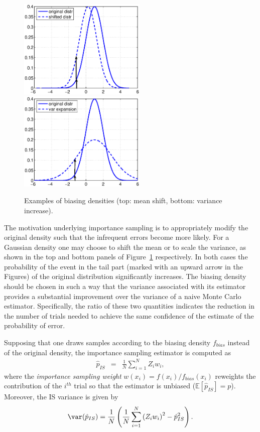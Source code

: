 \begin{figure}\centering
\includegraphics[width=2.4in,keepaspectratio]{itwfig3a_lara3.eps}
\includegraphics[width=2.4in,keepaspectratio]{itwfig3b_lara3.eps}
\caption{Examples of biasing densities (top: mean shift, bottom:
variance increase).} \label{bias}
\end{figure}

 The motivation underlying importance sampling is to appropriately
modify the original density such that the infrequent errors become
more likely. For a Gaussian density one may choose to shift the mean
or to scale the variance, as shown in the top and bottom panels of
Figure~\ref{bias} respectively.  In both cases the probability of the
event in the tail part (marked with an upward arrow in the Figures) of
the original distribution significantly increases.  The biasing
density should be chosen in such a way that the variance associated
with its estimator provides a substantial improvement over the
variance of a naive Monte Carlo estimator. Specifically, the ratio of
these two quantities indicates the reduction in the number of trials
needed to achieve the same confidence of the estimate of the
probability of error.

Supposing that one draws samples according to the biasing density
$f_{bias}$ instead of the original density, the importance sampling
estimator is computed as
\begin{eqnarray}
\label{EqnDefnIS}
\hat{p}_{IS} & = & \frac{1}{N}\sum_{i=1}^N Z_i w_i,
\end{eqnarray}
where the \emph{importance sampling weight} $w(x_i)
=f(x_i)/f_{bias}(x_i)$ reweights the contribution of the $i^{th}$
trial so that the estimator is unbiased ($\mathbb{E}[\hat{p}_{IS}] = p$).
Moreover, the IS variance is given by
\begin{eqnarray*}
\var(\hat{p}_{IS})=\frac{1}{N} \left( \frac{1}{N} \sum_{i=1}^N
\left(Z_i w_i \right)^2 -\hat{p}_{IS}^2 \right).
\end{eqnarray*}


